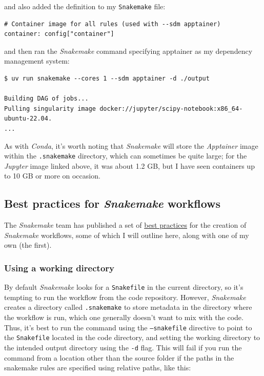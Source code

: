 and also added the definition to my \texttt{Snakemake} file:

\begin{lstlisting}[style=Python]
# Container image for all rules (used with --sdm apptainer)
container: config["container"]
\end{lstlisting}

and then ran the \textit{Snakemake} command specifying apptainer as my dependency management system:

\begin{lstlisting}[style=shell]
$ uv run snakemake --cores 1 --sdm apptainer -d ./output

Building DAG of jobs...
Pulling singularity image docker://jupyter/scipy-notebook:x86_64-ubuntu-22.04.
...
\end{lstlisting}

As with \textit{Conda}, it's worth noting that \textit{Snakemake} will store the \textit{Apptainer} image within the \texttt{.snakemake} directory, which can sometimes be quite large; for the \textit{Jupyter} image linked above, it was about 1.2 GB, but I have seen containers up to 10 GB or more on occasion.

\subsection{Best practices for \textit{Snakemake} workflows}

The \textit{Snakemake} team has published a set of \href{https://snakemake.readthedocs.io/en/stable/snakefiles/best\_practices.html}{best practices} for the creation of \textit{Snakemake} workflows, some of which I will outline here, along with one of my own (the first).

\subsubsection{Using a working directory}

By default \textit{Snakemake} looks for a \texttt{Snakefile} in the current directory, so it's tempting to run the workflow from the code repository.  However, \textit{Snakemake} creates a directory called \texttt{.snakemake} to store metadata in the directory where the workflow is run, which one generally doesn't want to mix with the code.  Thus, it's best to run the command using the \texttt{--snakefile} directive to point to the \texttt{Snakefile} located in the code directory, and setting the working directory to the intended output directory using the \texttt{-d} flag. This will fail if you run the command from a location other than the source folder if the paths in the snakemake rules are specified using relative paths, like this:

